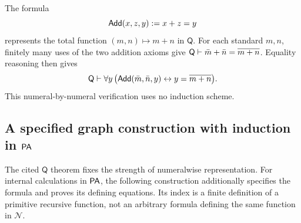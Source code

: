 \begin{example}
The formula
\[
  \mathsf{Add}(x,z,y)\mathrel{:=} x+z=y
\]
represents the total function \((m,n)\mapsto m+n\) in \(\mathsf Q\).  For each
standard \(m,n\), finitely many uses of the two addition axioms give
\(\mathsf Q\vdash\bar m+\bar n=\overline{m+n}\).  Equality reasoning then
gives
\[
  \mathsf Q\vdash\forall y\,
  \bigl(\mathsf{Add}(\bar m,\bar n,y)
  \leftrightarrow y=\overline{m+n}\bigr).
\]
This numeral-by-numeral verification uses no induction scheme.
\end{example}

\subsection*{A specified graph construction with induction in \(\mathsf{PA}\)}

The cited \(\mathsf Q\) theorem fixes the strength of numeralwise
representation.  For internal calculations in \(\mathsf{PA}\), the following
construction additionally specifies the formula and proves its defining
equations.  Its index is a finite definition of a primitive recursive
function, not an arbitrary formula defining the same function in
\(\mathcal N\).


